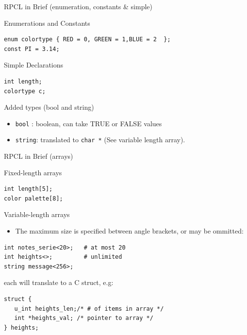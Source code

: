 \documentclass[bigger,hyperref={colorlinks=true, urlcolor=red, plainpages=false, pdfpagelabels, bookmarksnumbered}]{beamer}
\begin{document}
\begin{frame}[fragile,label=sec-2-20]{RPCL in Brief (enumeration, constants \& simple)}
 \begin{block}{Enumerations and Constants}
\lstset{language=C,label= ,caption= ,numbers=none}
\begin{lstlisting}
enum colortype { RED = 0, GREEN = 1,BLUE = 2  };
const PI = 3.14;
\end{lstlisting}
\end{block}
\begin{block}{Simple Declarations}
\lstset{language=C,label= ,caption= ,numbers=none}
\begin{lstlisting}
int length;
colortype c;
\end{lstlisting}
\end{block}
\begin{block}{Added types (bool and string)}
\begin{itemize}
\item \texttt{bool} : boolean, can take TRUE or FALSE values
\item \texttt{string}: translated to \texttt{char *} (See variable length array).
\end{itemize}
\end{block}
\end{frame}
\begin{frame}[fragile,label=sec-2-21]{RPCL in Brief (arrays)}
 \begin{block}{Fixed-length arrays}
\lstset{language=C,label= ,caption= ,numbers=none}
\begin{lstlisting}
int length[5];
color palette[8];
\end{lstlisting}
\end{block}

\begin{block}{Variable-length arrays}
\begin{itemize}
\item The maximum size is specified between angle brackets, or may be ommitted:
\end{itemize}
\lstset{language=C,label= ,caption= ,numbers=none}
\begin{lstlisting}
int notes_serie<20>;   # at most 20
int heights<>;         # unlimited
string message<256>;
\end{lstlisting}
each will translate to a C struct, e.g:
\lstset{language=C,label= ,caption= ,numbers=none}
\begin{lstlisting}
struct {
   u_int heights_len;/* # of items in array */
   int *heights_val; /* pointer to array */
} heights;
\end{lstlisting}
\end{block}
\end{frame}
\end{document}
